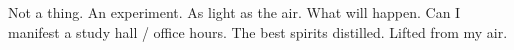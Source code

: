 

Not a thing.  An experiment.  As light as the air.  What will happen.
Can I manifest a study hall / office hours.  The best spirits
distilled.  Lifted from my air.  

\bye
